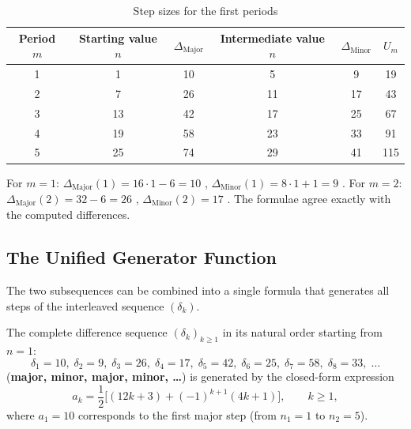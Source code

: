 \begin{table}[htbp]
\centering
\caption{Step sizes for the first periods}
\begin{tabular}{c|cc|cc|c}
\toprule
Period $m$ & Starting value $n$ & $\Delta_{\mathrm{Major}}$ &
Intermediate value $n$ & $\Delta_{\mathrm{Minor}}$ & $U_m$ \\
\midrule
1 & 1  & 10 & 5  & 9  & 19 \\
2 & 7  & 26 & 11 & 17 & 43 \\
3 & 13 & 42 & 17 & 25 & 67 \\
4 & 19 & 58 & 23 & 33 & 91 \\
5 & 25 & 74 & 29 & 41 & 115 \\
\bottomrule
\end{tabular}
\end{table}

\begin{bemerkung}
For $m=1$: $\Delta_{\mathrm{Major}}(1) = 16\cdot1 - 6 = 10$ ,
$\Delta_{\mathrm{Minor}}(1) = 8\cdot1 + 1 = 9$ .
For $m=2$: $\Delta_{\mathrm{Major}}(2) = 32-6 = 26$ ,
$\Delta_{\mathrm{Minor}}(2) = 17$ . The formulae agree
exactly with the computed differences.
\end{bemerkung}

\subsection{The Unified Generator Function}

The two subsequences can be combined into a single formula
that generates all steps of the interleaved sequence $(\delta_k)$.

\begin{satz}
The complete difference sequence $(\delta_k)_{k \geq 1}$ in its natural
order starting from $n = 1$:
\[
  \delta_1 = 10,\; \delta_2 = 9,\; \delta_3 = 26,\; \delta_4 = 17,\;
  \delta_5 = 42,\; \delta_6 = 25,\; \delta_7 = 58,\; \delta_8 = 33,\; \ldots
\]
(\textbf{major, minor, major, minor, \ldots}) is generated by the closed-form expression
\begin{equation}
  a_k = \frac{1}{2}\bigl[(12k+3) + (-1)^{k+1}(4k+1)\bigr],
  \qquad k \geq 1,
\end{equation}
where $a_1 = 10$ corresponds to the first major step (from $n_1 = 1$ to $n_2 = 5$).
\end{satz}

